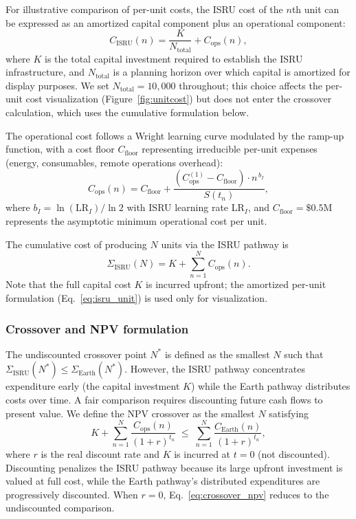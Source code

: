 \documentclass[preprint,12pt]{elsarticle}
\begin{document}
For illustrative comparison of per-unit costs, the ISRU cost of the $n$th unit can be expressed as an amortized capital component plus an operational component:
\begin{equation}
  C_{\mathrm{ISRU}}(n) = \frac{K}{N_{\mathrm{total}}} + C_{\mathrm{ops}}(n),
  \label{eq:isru_unit}
\end{equation}
where $K$ is the total capital investment required to establish the ISRU infrastructure, and $N_{\mathrm{total}}$ is a planning horizon over which capital is amortized for display purposes. We set $N_{\mathrm{total}} = 10{,}000$ throughout; this choice affects the per-unit cost visualization (Figure~\ref{fig:unitcost}) but does not enter the crossover calculation, which uses the cumulative formulation below.

The operational cost follows a Wright learning curve modulated by the ramp-up function, with a cost floor $C_{\mathrm{floor}}$ representing irreducible per-unit expenses (energy, consumables, remote operations overhead):
\begin{equation}
  C_{\mathrm{ops}}(n) = C_{\mathrm{floor}} + \frac{\left(C_{\mathrm{ops}}^{(1)} - C_{\mathrm{floor}}\right) \cdot n^{\,b_I}}{S(t_n)},
  \label{eq:isru_ops}
\end{equation}
where $b_I = \ln(\mathrm{LR}_I)/\ln 2$ with ISRU learning rate $\mathrm{LR}_I$, and $C_{\mathrm{floor}} = \$0.5$M represents the asymptotic minimum operational cost per unit.

The cumulative cost of producing $N$ units via the ISRU pathway is
\begin{equation}
  \Sigma_{\mathrm{ISRU}}(N) = K + \sum_{n=1}^{N} C_{\mathrm{ops}}(n).
  \label{eq:isru_cum}
\end{equation}
Note that the full capital cost $K$ is incurred upfront; the amortized per-unit formulation (Eq.~\ref{eq:isru_unit}) is used only for visualization.

\subsubsection{Crossover and NPV formulation}

The undiscounted crossover point $N^*$ is defined as the smallest $N$ such that $\Sigma_{\mathrm{ISRU}}(N^*) \leq \Sigma_{\mathrm{Earth}}(N^*)$. However, the ISRU pathway concentrates expenditure early (the capital investment $K$) while the Earth pathway distributes costs over time. A fair comparison requires discounting future cash flows to present value. We define the NPV crossover as the smallest $N$ satisfying
\begin{equation}
  K + \sum_{n=1}^{N} \frac{C_{\mathrm{ops}}(n)}{(1+r)^{t_n}} \;\leq\; \sum_{n=1}^{N} \frac{C_{\mathrm{Earth}}(n)}{(1+r)^{t_n}},
  \label{eq:crossover_npv}
\end{equation}
where $r$ is the real discount rate and $K$ is incurred at $t = 0$ (not discounted). Discounting penalizes the ISRU pathway because its large upfront investment is valued at full cost, while the Earth pathway's distributed expenditures are progressively discounted. When $r = 0$, Eq.~\ref{eq:crossover_npv} reduces to the undiscounted comparison.
\end{document}
